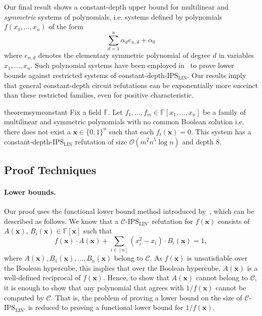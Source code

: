 \documentclass[11pt]{article}
\newcommand{\Boo}{\{0,1 \}}
\newcommand{\bigO}{\mathcal{O}}
\newcommand{\F}{\mathbb{F}}
\newcommand{\IPSLIN}{\mathrm{IPS}_{\mathrm{LIN}}}
\newcommand{\IPSLINp}{\mathrm{IPS}_{\mathrm{LIN}'}}
\newcommand{\xbar}{\mathbf{x}}
\begin{document}
Our final result shows a constant-depth upper bound for multilinear and \emph{symmetric} systems of polynomials, i.e. systems defined by polynomials $f(x_1,\ldots,x_n)$ of the form 
\[
\sum_{d=1}^n \alpha_d e_{n,d} + \alpha_0
\]
where $e_{n,d}$ denotes the elementary symmetric polynomial of degree $d$ in variables $x_1,\ldots,x_n.$ Such polynomial systems have been employed in~\cite{FSTW21} to prove lower bounds against restricted systems of constant-depth-$\IPSLIN.$ Our results imply that general constant-depth circuit refutations can be exponentially more succinct than these restricted families, even for positive characteristic.


\begin{restatable}{theorem}{symconstant}\label{thm:ubd-sym-const-depth}
Fix a field $\F$. Let \break $f_1,\ldots,f_m \in \F[x_{1},\ldots,x_{n}]$ be a family of multilinear and symmetric polynomials with no common Boolean solution i.e. there does not exist a $\mathbf{x} \in \Boo^{n}$ such that each $f_{i}(\mathbf{x}) = 0$. This system has a constant-depth-$\IPSLIN$ refutation of size $\bigO(m^{2} n^{5} \log n)$ and depth $8$.
\end{restatable}




\subsection{Proof Techniques}
\label{sec:techniques}
\paragraph{Lower bounds.}
Our proof uses the functional lower bound method introduced by~\cite{FSTW21}, which can be described as follows. We know that a $\mathcal{C}$-$\IPSLINp$ refutation for $f(\xbar)$ consists of $A(\xbar)$, $B_{i}(\xbar) \in \mathbb{F}[\xbar]$ such that \[f(\xbar) \cdot A(\xbar) + \sum_{i \in [n]} (x_i^2 - x_i) \cdot B_{i}(\xbar) = 1,\] where $A(\xbar), B_{1}(\xbar), \ldots, B_{n}(\xbar)$ belong to $\mathcal{C}$. As $f(\xbar)$ is unsatisfiable over the Boolean hypercube, this implies that over the Boolean hypercube, $A(\xbar)$ is a well-defined reciprocal of $f(\xbar)$. Hence, to show that $A(\xbar)$ cannot belong to $\mathcal{C}$, it is enough to show that any polynomial that agrees with $1/f(\xbar)$ cannot be computed by $\mathcal{C}$. That is, the problem of proving a lower bound on the size of $\mathcal{C}$-$\IPSLINp$ is reduced to proving a functional lower bound for $1/f(\xbar)$. 
\end{document}

